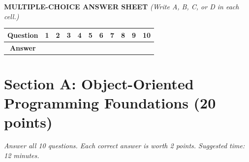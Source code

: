\documentclass[11pt,a4paper]{article}
\begin{document}
\vspace{1mm}
\textbf{MULTIPLE-CHOICE ANSWER SHEET} \textit{(Write A, B, C, or D in each cell.)}
\begin{center}\setlength{\tabcolsep}{5pt}\renewcommand{\arraystretch}{1.1}
\begin{tabular}{|c|c|c|c|c|c|c|c|c|c|c|}\hline
\textbf{Question} & \textbf{1} & \textbf{2} & \textbf{3} & \textbf{4} & \textbf{5} & \textbf{6} & \textbf{7} & \textbf{8} & \textbf{9} & \textbf{10} \\ \hline
\textbf{Answer} & & & & & & & & & & \\[1.5mm] \hline
\end{tabular}\end{center}
\vspace{-2.5mm}
\section*{Section A: Object-Oriented Programming Foundations \hfill \normalsize\normalfont(20 points)}
\textit{Answer all 10 questions. Each correct answer is worth 2 points. Suggested time: 12 minutes.}
\end{document}
